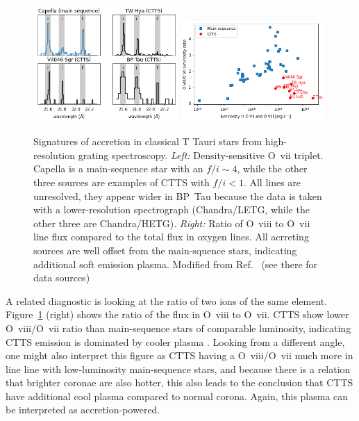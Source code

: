 \begin{figure}[t]
\centering
\includegraphics[width=0.49\textwidth]{figs/o7f2i.png}
\includegraphics[width=0.49\textwidth]{figs/o72o8.png}
\caption{Signatures of accretion in classical T Tauri stars from high-resolution grating spectroscopy. \emph{Left:} Density-sensitive O~{\sc vii} triplet. Capella is a main-sequence star with an $f/i\sim 4$, while the other three sources are examples of CTTS with $f/i < 1$. All lines are unresolved, they appear wider in BP~Tau because the data is taken with a lower-resolution spectrograph (Chandra/LETG, while the other three are Chandra/HETG). \emph{Right:} Ratio of O~{\sc viii} to O~{\sc vii} line flux compared to the total flux in oxygen lines. All acrreting sources are well offset from the main-squence stars, indicating additional soft emission plasma. Modified from Ref.~ \cite{2013ApJ...771...70G} (see there for data sources) \label{fig:softexcess}}
\end{figure}

A related diagnostic is looking at the ratio of two ions of the same element. Figure~\ref{fig:softexcess} (right) shows the ratio of the flux in O~{\sc viii} to O~{\sc vii}. CTTS show lower O~{\sc viii}/O~{\sc vii} ratio than main-sequence stars of comparable luminosity, indicating CTTS emission is dominated by cooler plasma \cite{2007A&A...473..229R,2007A&A...474L..25G}. Looking from a different angle, one might also interpret this figure as  CTTS having a O~{\sc viii}/O~{\sc vii} much more in line line with low-luminosity main-sequence stars, and because there is a relation that brighter coronae are also hotter, this also leads to the conclusion that CTTS have additional cool plasma compared to normal corona. Again, this plasma can be interpreted as accretion-powered.

